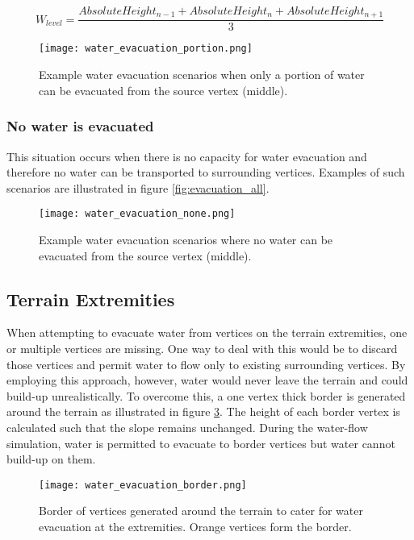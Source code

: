\begin{equation} \label{eq:water_level_calc}
	W_{level} = \frac{AbsoluteHeight_{n-1} + AbsoluteHeight_{n} + AbsoluteHeight_{n+1}}{3}
\end{equation}

\begin{figure}
\center
	\texttt{[image: water\_evacuation\_portion.png]}
	\caption{ Example water evacuation scenarios when only a portion of water can be evacuated from the source vertex (middle).}
	\label{fig:evacuation_portion}
\end{figure}

\subsubsection{No water is evacuated}

This situation occurs when there is no capacity for water evacuation and therefore no water can be transported to surrounding vertices. Examples of such scenarios are illustrated in figure \ref{fig:evacuation_all}.

\begin{figure}
\center
	\texttt{[image: water\_evacuation\_none.png]}
	\caption{ Example water evacuation scenarios where no water can be evacuated from the source vertex (middle).}
	\label{fig:evacuation_none}
\end{figure}

\subsection{Terrain Extremities}

When attempting to evacuate water from vertices on the terrain extremities, one or multiple vertices are missing. One way to deal with this would be to discard those vertices and permit water to flow only to existing surrounding vertices. By employing this approach, however, water would never leave the terrain and could build-up unrealistically. To overcome this, a one vertex thick border is generated around the terrain as illustrated in figure \ref{fig:evacuation_border}. The height of each border vertex is calculated such that the slope remains unchanged. During the water-flow simulation, water is permitted to evacuate to border vertices but water cannot build-up on them.

\begin{figure}
\center
	\texttt{[image: water\_evacuation\_border.png]}
	\caption{ Border of vertices generated around the terrain to cater for water evacuation at the extremities. Orange vertices form the border. }
	\label{fig:evacuation_border}
\end{figure}

